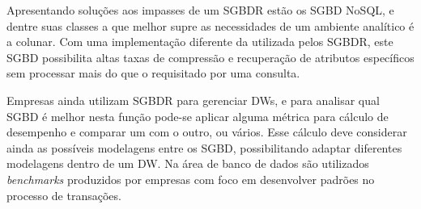 Apresentando soluções aos impasses de um SGBDR estão os SGBD NoSQL, e dentre suas classes a que melhor supre as necessidades de um ambiente analítico é a colunar. Com uma implementação diferente da utilizada pelos SGBDR, este SGBD possibilita altas taxas de compressão e recuperação de atributos específicos sem processar mais do que o requisitado por uma consulta. 

Empresas ainda utilizam SGBDR para gerenciar DWs, e para analisar qual SGBD é melhor nesta função pode-se aplicar alguma métrica para cálculo de desempenho e comparar um com o outro, ou vários. Esse cálculo deve considerar ainda as possíveis modelagens entre os SGBD, possibilitando adaptar diferentes modelagens dentro de um DW. Na área de banco de dados são utilizados \textit{benchmarks} produzidos por empresas com foco em desenvolver padrões no processo de transações.